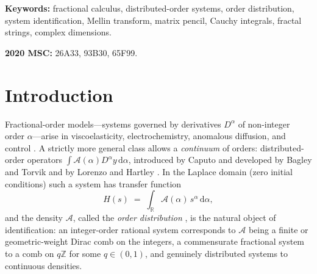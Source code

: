 \documentclass[11pt, a4paper]{article}
\theoremstyle{definition}
\theoremstyle{remark}
\newcommand{\R}{\mathbb{R}}
\newcommand{\Z}{\mathbb{Z}}
\newcommand{\dd}{\,\mathrm{d}}
\begin{document}
\noindent\textbf{Keywords:} fractional calculus, distributed-order systems,
order distribution, system identification, Mellin transform, matrix pencil,
Cauchy integrals, fractal strings, complex dimensions.

\noindent\textbf{2020 MSC:} 26A33, 93B30, 65F99.

\section{Introduction}\label{sec:intro}

Fractional-order models---systems governed by derivatives
$D^{\alpha}$ of non-integer order $\alpha$---arise in viscoelasticity,
electrochemistry, anomalous diffusion, and control
\cite{DingReview2021, JiaoChenPodlubny2012}. A strictly more general class
allows a \emph{continuum} of orders: distributed-order operators
$\int \mathcal{A}(\alpha) D^{\alpha}y \dd\alpha$, introduced by Caputo
\cite{Caputo1969,Caputo1995, Caputo2001} and developed by Bagley and Torvik
\cite{BagleyTorvik2000a,BagleyTorvik2000b} and by Lorenzo and Hartley
\cite{LorenzoHartley2002}. In the Laplace domain (zero initial conditions)
such a system has transfer function
\begin{equation}\label{eq:orderintegral}
H(s) \;=\; \int_{\R} \mathcal{A}(\alpha)\, s^{\alpha} \dd\alpha ,
\end{equation}
and the density $\mathcal{A}$, called the \emph{order distribution}
\cite{HartleyLorenzo1999,HartleyLorenzo2003}, is the natural object of
identification: an integer-order rational system corresponds to
$\mathcal{A}$ being a finite or geometric-weight Dirac comb on the integers,
a commensurate fractional system to a comb on $q\Z$ for some $q\in(0,1)$,
and genuinely distributed systems to continuous densities.
\end{document}
